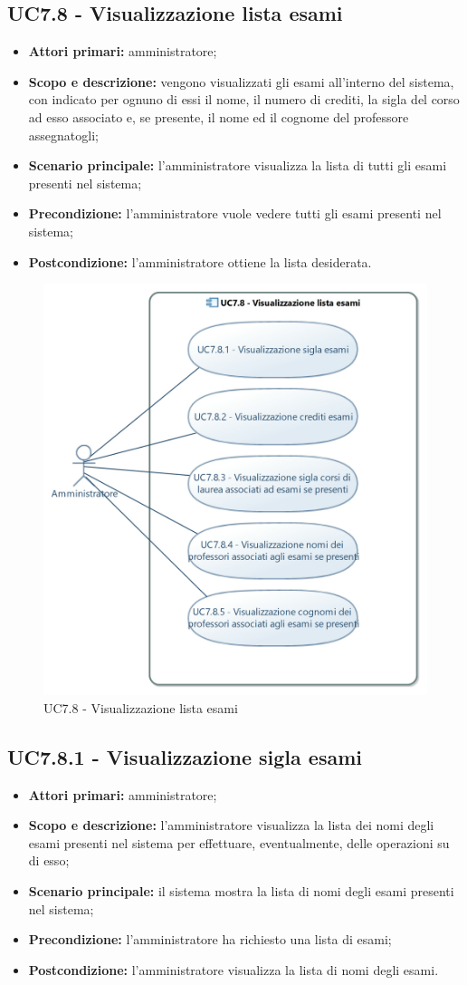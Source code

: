 \documentclass[AnalisiDeiRequisiti.tex]{subfiles}
\begin{document}
\subsection{UC7.8 - Visualizzazione lista esami}
\begin{itemize}
	\item \textbf{Attori primari:} amministratore;
	\item \textbf{Scopo e descrizione:} vengono visualizzati gli esami all'interno del sistema, con indicato per ognuno di essi il nome, il numero di crediti, la sigla del corso ad esso associato e, se presente, il nome ed il cognome del professore assegnatogli;
	\item \textbf{Scenario principale:} l'amministratore visualizza la lista di tutti gli esami presenti nel sistema;
	\item \textbf{Precondizione:} l'amministratore vuole vedere tutti gli esami presenti nel sistema; 
	\item \textbf{Postcondizione:} l'amministratore ottiene la lista desiderata.
\end{itemize}
\begin{figure}[H]
	\centering
	\includegraphics[width=0.7\linewidth]{UC7_8.jpg}
	\caption{UC7.8 - Visualizzazione lista esami}
	\label{fig:UC7.8 - Visualizzazione lista esami}
\end{figure}
\subsection{UC7.8.1 - Visualizzazione sigla esami}
\begin{itemize}
	\item \textbf{Attori primari:} amministratore;
	\item \textbf{Scopo e descrizione:} l'amministratore visualizza la lista dei nomi degli esami presenti nel sistema per effettuare, eventualmente, delle operazioni su di esso;
	\item \textbf{Scenario principale:} il sistema mostra la lista di nomi degli esami presenti nel sistema;
	\item \textbf{Precondizione:} l'amministratore ha richiesto una lista di esami; 
	\item \textbf{Postcondizione:} l'amministratore visualizza la lista di nomi degli esami.
\end{itemize}
\end{document}
